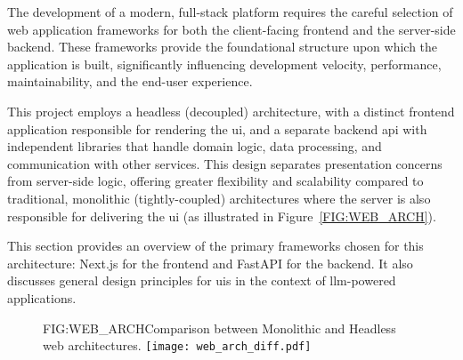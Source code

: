 The development of a modern, full-stack platform requires the careful selection of web application frameworks for both the client-facing frontend and the server-side backend. These frameworks provide the foundational structure upon which the application is built, significantly influencing development velocity, performance, maintainability, and the end-user experience.

This project employs a headless (decoupled) architecture, with a distinct frontend application responsible for rendering the \acl{ui}, and a separate backend \acs{api} with independent libraries that handle domain logic, data processing, and communication with other services. This design separates presentation concerns from server-side logic, offering greater flexibility and scalability compared to traditional, monolithic (tightly-coupled) architectures where the server is also responsible for delivering the \acl{ui} (as illustrated in Figure~\ref{FIG:WEB_ARCH}). 

This section provides an overview of the primary frameworks chosen for this architecture: Next.js for the frontend and FastAPI for the backend. It also discusses general design principles for \aclp{ui} in the context of \ac{llm}-powered applications.

\begin{figure}[Comparison of Tightly-Coupled and Decoupled Web Architectures]{FIG:WEB_ARCH}{Comparison between Monolithic and Headless web architectures.}
    \texttt{[image: web\_arch\_diff.pdf]}
\end{figure}